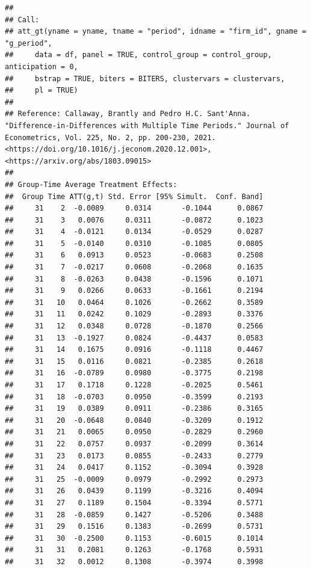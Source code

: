 \documentclass[
]{article}
\begin{document}
\begin{verbatim}
## 
## Call:
## att_gt(yname = yname, tname = "period", idname = "firm_id", gname = "g_period", 
##     data = df, panel = TRUE, control_group = control_group, anticipation = 0, 
##     bstrap = TRUE, biters = BITERS, clustervars = clustervars, 
##     pl = TRUE)
## 
## Reference: Callaway, Brantly and Pedro H.C. Sant'Anna.  "Difference-in-Differences with Multiple Time Periods." Journal of Econometrics, Vol. 225, No. 2, pp. 200-230, 2021. <https://doi.org/10.1016/j.jeconom.2020.12.001>, <https://arxiv.org/abs/1803.09015> 
## 
## Group-Time Average Treatment Effects:
##  Group Time ATT(g,t) Std. Error [95% Simult.  Conf. Band]  
##     31    2  -0.0089     0.0314       -0.1044      0.0867  
##     31    3   0.0076     0.0311       -0.0872      0.1023  
##     31    4  -0.0121     0.0134       -0.0529      0.0287  
##     31    5  -0.0140     0.0310       -0.1085      0.0805  
##     31    6   0.0913     0.0523       -0.0683      0.2508  
##     31    7  -0.0217     0.0608       -0.2068      0.1635  
##     31    8  -0.0263     0.0438       -0.1596      0.1071  
##     31    9   0.0266     0.0633       -0.1661      0.2194  
##     31   10   0.0464     0.1026       -0.2662      0.3589  
##     31   11   0.0242     0.1029       -0.2893      0.3376  
##     31   12   0.0348     0.0728       -0.1870      0.2566  
##     31   13  -0.1927     0.0824       -0.4437      0.0583  
##     31   14   0.1675     0.0916       -0.1118      0.4467  
##     31   15   0.0116     0.0821       -0.2385      0.2618  
##     31   16  -0.0789     0.0980       -0.3775      0.2198  
##     31   17   0.1718     0.1228       -0.2025      0.5461  
##     31   18  -0.0703     0.0950       -0.3599      0.2193  
##     31   19   0.0389     0.0911       -0.2386      0.3165  
##     31   20  -0.0648     0.0840       -0.3209      0.1912  
##     31   21   0.0065     0.0950       -0.2829      0.2960  
##     31   22   0.0757     0.0937       -0.2099      0.3614  
##     31   23   0.0173     0.0855       -0.2433      0.2779  
##     31   24   0.0417     0.1152       -0.3094      0.3928  
##     31   25  -0.0009     0.0979       -0.2992      0.2973  
##     31   26   0.0439     0.1199       -0.3216      0.4094  
##     31   27   0.1189     0.1504       -0.3394      0.5771  
##     31   28  -0.0859     0.1427       -0.5206      0.3488  
##     31   29   0.1516     0.1383       -0.2699      0.5731  
##     31   30  -0.2500     0.1153       -0.6015      0.1014  
##     31   31   0.2081     0.1263       -0.1768      0.5931  
##     31   32   0.0012     0.1308       -0.3974      0.3998  

\end{verbatim}
\end{document}
